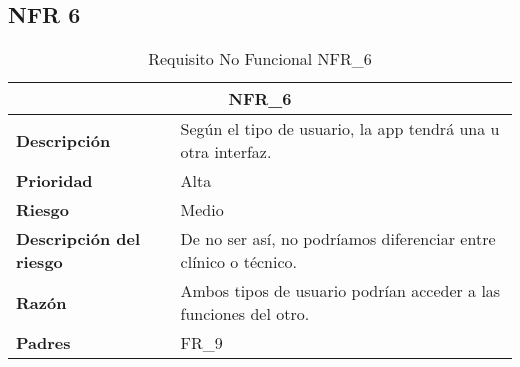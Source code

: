 \documentclass{scrreprt}
\begin{document}
\subsection{NFR 6}
    \begin{table}[H]
        \label{tab:my-table}
        \begin{tabular}{|p{5cm}|p{11cm}|}
        \hline
        \multicolumn{2}{|c|}{\textbf{NFR_6}} \\
        \hline
        \textbf{Descripción  }                      &  Según el tipo de usuario, la app tendrá una u otra interfaz.                                                                      \\ \hline
        \textbf{Prioridad}                          & Alta                                                                                              \\ \hline
        \textbf{Riesgo}                          & Medio                                                                                                \\ \hline
        \textbf{Descripción del riesgo}                    &  De no ser así, no podríamos diferenciar entre clínico o técnico.                          \\ \hline
        \textbf{Razón}                   & Ambos tipos de usuario podrían acceder a las funciones del otro.                                                                                                                       \\ \hline
        \textbf{Padres}                               &  FR_9\\  \hline
        \end{tabular}%
        
        \caption{Requisito No Funcional NFR_6}
\end{table}
\end{document}
